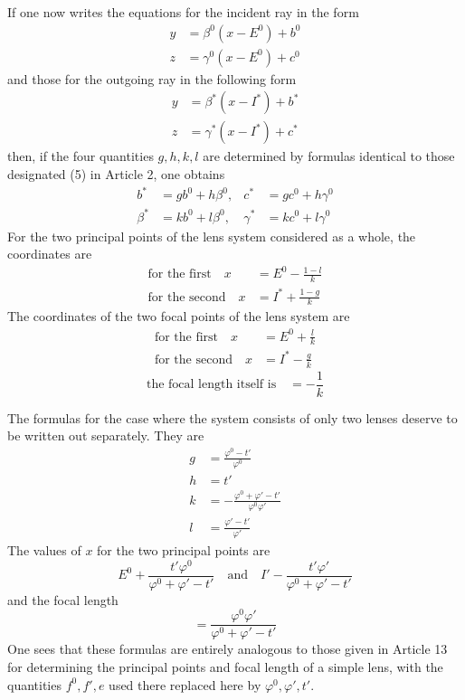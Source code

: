 If one now writes the equations for the incident ray in the form
\[
\begin{aligned}
y&=\beta^0(x-E^0)+b^0\\
z&=\gamma^0(x-E^0)+c^0
\end{aligned}
\]
and those for the outgoing ray in the following form
\[
\begin{aligned}
y&=\beta^*(x-I^*)+b^*\\
z&=\gamma^*(x-I^*)+c^*
\end{aligned}
\]
then, if the four quantities $g,h,k,l$ are determined by formulas identical to those designated (5) in Article 2, one obtains
\[
\begin{aligned}
b^*&=gb^0+h\beta^0,&c^*&=gc^0+h\gamma^0\\
\beta^*&=kb^0+l\beta^0,&\gamma^*&=kc^0+l\gamma^0
\end{aligned}
\]
For the two principal points of the lens system considered as a whole, the coordinates are
\[
\begin{aligned}
\text{for the first}\quad x&=E^0-\frac{1-l}{k}\\
\text{for the second}\quad x&=I^*+\frac{1-g}{k}
\end{aligned}
\]
The coordinates of the two focal points of the lens system are
\[
\begin{aligned}
\text{for the first}\quad x&=E^0+\frac{l}{k}\\
\text{for the second}\quad x&=I^*-\frac{g}{k}
\end{aligned}
\]
\[
\text{the focal length itself is}\quad=-\frac1k
\]

The formulas for the case where the system consists of only two lenses deserve to be written out separately. They are
\[
\begin{aligned}
g&=\frac{\varphi^0-t'}{\varphi^0}\\
h&=t'\\
k&=-\frac{\varphi^0+\varphi'-t'}{\varphi^0\varphi'}\\
l&=\frac{\varphi'-t'}{\varphi'}
\end{aligned}
\]
The values of $x$ for the two principal points are
\[
E^0+\frac{t'\varphi^0}{\varphi^0+\varphi'-t'}\quad\text{and}\quad I'-\frac{t'\varphi'}{\varphi^0+\varphi'-t'}
\]
and the focal length
\[
=\frac{\varphi^0\varphi'}{\varphi^0+\varphi'-t'}
\]
One sees that these formulas are entirely analogous to those given in Article 13 for determining the principal points and focal length of a simple lens, with the quantities $f^0,f',e$ used there replaced here by $\varphi^0,\varphi',t'$.

